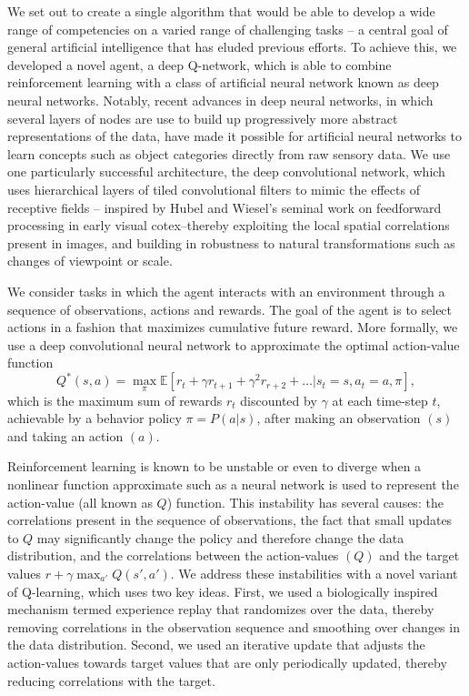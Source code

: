 \documentclass[letterpaper]{article}
\begin{document}
We set out to create a single algorithm that would be able to develop a wide range of competencies on a varied range of challenging tasks -- a central goal of general artificial intelligence that has eluded previous efforts. To achieve this, we developed a novel agent, a deep Q-network, which is able to combine reinforcement learning with a class of artificial neural network known as deep neural networks. Notably, recent advances in deep neural networks, in which several layers of nodes are use to build up progressively more abstract representations of the  data, have made it possible for artificial neural networks to learn concepts such as object categories directly from raw sensory data. We use one particularly successful architecture, the deep convolutional network, which uses hierarchical layers of tiled convolutional filters to mimic the effects of receptive fields -- inspired by Hubel and Wiesel's seminal work on feedforward processing in early visual cotex--thereby exploiting the local spatial correlations present in images, and building in robustness to natural transformations such as changes of viewpoint or scale. 

We consider tasks in which the agent interacts with an environment through a sequence of observations, actions and rewards. The goal of the agent is to select actions in a fashion that maximizes cumulative future reward. More formally, we use a deep convolutional neural network to approximate the optimal action-value function 
\[Q^*(s,a)=\max_{\pi}\mathbb{E}[r_t+\gamma r_{t+1}+\gamma^2r_{r+2}+\ldots|s_t=s,a_t=a,\pi],\]
which is the maximum sum of rewards $r_t$ discounted by $\gamma$ at each time-step $t$, achievable by a behavior policy $\pi=P(a|s)$, after making an observation $(s)$ and taking an action $(a)$.

Reinforcement learning is known to be unstable or even to diverge when a nonlinear function approximate such as a neural network is used to represent the action-value (all known as $Q$) function. This instability has several causes: the correlations present in the sequence of observations, the fact that small updates to $Q$ may significantly change the policy and therefore change the data distribution, and the correlations between the action-values $(Q)$ and the target values $r+\gamma\max_{a'}Q(s',a')$. We address these instabilities with a novel variant of Q-learning, which uses two key ideas. First, we used a biologically inspired mechanism termed experience replay that randomizes over the data, thereby removing correlations in the observation sequence and smoothing over changes in the data distribution. Second, we used an iterative update that adjusts the action-values towards target values that are only periodically updated, thereby reducing correlations with the target.
\end{document}
